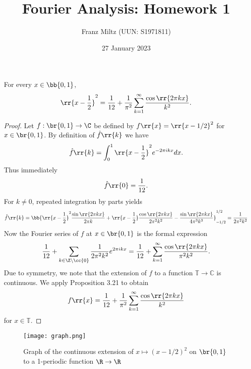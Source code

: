 \documentclass{article}
\begin{document}
\title{Fourier Analysis: Homework 1}
\author{Franz Miltz (UUN: S1971811)}
\date{27 January 2023}
\maketitle

\begin{claim*}[4c]
  For every $x\in\bb{0,1}$,
  \begin{align*}
    \rr{x-\frac{1}{2}}^2 = \frac{1}{12}+\frac{1}{\pi^2}\sum_{k=1}^{ \infty } \frac{\cos\rr{2\pi kx}}{k^2}.
  \end{align*}
  \begin{proof}
    Let $f:\br{0,1}\to\C$ be defined by $f\rr{x}=\rr{x-1/2}^2$ for $x\in\br{0,1}$.
    By definition of $\hat f\rr{k}$ we have
    \begin{align*}
      \hat f \rr{k} = \int_0^1 \rr{x-\frac{1}{2}}^2 e^{-2\pi ikx}dx.
    \end{align*}
    Thus immediately
    \begin{align*}
      \hat f\rr{0}=\frac{1}{12}.
    \end{align*}
    For $k\neq 0$, repeated integration by parts yields
    \begin{align*}
      \hat f\rr{k}=\bb{\rr{x-\frac{1}{2}}^2\frac{\sin\rr{2\pi kx}}{2\pi k}+\rr{x-\frac{1}{2}}\frac{\cos\rr{2\pi kx}}{2\pi^2 k^2}-\frac{\sin\rr{2\pi kx}}{4\pi^3k^3}}_{-1/2}^{1/2}
      = \frac{1}{2\pi^2k^2}
    \end{align*}
    Now the Fourier series of $f$ at $x\in\br{0,1}$ is the formal expression
    \begin{align*}
      \frac{1}{12}+\sum_{k\in\Z\setminus\cc{0}} \frac{1}{2\pi^2k^2}e^{2\pi ikx}
      =\frac{1}{12}+\sum_{k=1}^{\infty}\frac{\cos\rr{2\pi kx}}{\pi^2 k^2}.
    \end{align*}
    Due to symmetry, we note that the extension of $f$ to a function $\mathbb T\to\mathbb C$
    is continuous. We apply Proposition 3.21 to obtain
    \begin{align*}
      f\rr{x}=\frac{1}{12}+\frac{1}{\pi^2}\sum_{k=1}^{\infty} \frac{\cos\rr{2\pi kx}}{k^2}
    \end{align*}
    for $x\in\mathbb{T}$.
  \end{proof}
\end{claim*}

\begin{figure}
  \texttt{[image: graph.png]}
  \caption{Graph of the continuous extension of $x\mapsto(x-1/2)^2$ on $\br{0,1}$
  to a 1-periodic function $\R\to\R$}
\end{figure}
\end{document}
